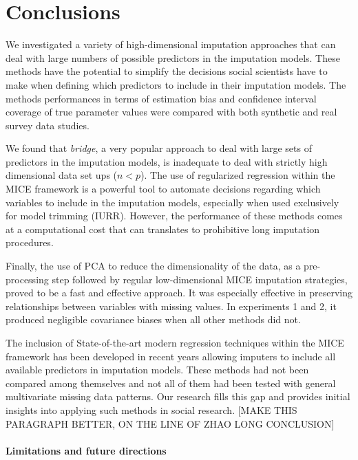\section{Conclusions}

	We investigated a variety of high-dimensional imputation approaches that can deal with large numbers 
	of possible predictors in the imputation models.
	These methods have the potential to simplify the decisions social scientists have to make when defining
	which predictors to include in their imputation models.
	The methods performances in terms of estimation bias and confidence interval coverage of true parameter values were 
	compared with both synthetic and real survey data studies.

	We found that \emph{bridge}, a very popular approach to deal with large sets of predictors in the imputation models,
	is inadequate to deal with strictly high dimensional data set ups ($n < p$).
	The use of regularized regression within the MICE framework is a powerful tool to automate decisions regarding which
	variables to include in the imputation models, especially when used exclusively for model trimming (IURR).
	However, the performance of these methods comes at a computational cost that can translates to 
	prohibitive long imputation procedures.

	Finally, the use of PCA to reduce the dimensionality of the data, as a pre-processing step followed by regular 
	low-dimensional MICE imputation strategies, proved to be a fast and effective approach.
	It was especially effective in preserving relationships between variables with missing values.
	In experiments 1 and 2, it produced negligible covariance biases when all other methods did not.

	The inclusion of State-of-the-art modern regression techniques within the MICE framework has been developed 
	in recent years allowing imputers to include all available predictors in imputation models.
	These methods had not been compared among themselves and not all of them had been tested with general multivariate 
	missing data patterns.
	Our research fills this gap and provides initial insights into applying such methods in social research.
	[MAKE THIS PARAGRAPH BETTER, ON THE LINE OF ZHAO LONG CONCLUSION]

\paragraph{Limitations and future directions}

